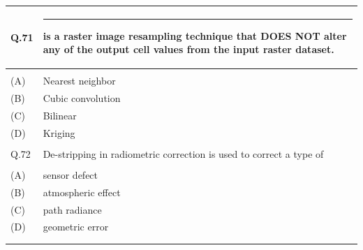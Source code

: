 \documentclass[12pt]{article}
\begin{document}
 \begin{table}[H]
\renewcommand{\arraystretch}{3}
\setlength{\tabcolsep}{8pt}
\begin{tabular}{|l|p{15cm}|}
\hline
 
Q.71&\rule{2cm}{0.15mm} is a raster image resampling technique that DOES NOT alter any of the
output cell values from the input raster dataset.\\ \hline 
&  \\ \hline
(A)&Nearest neighbor\\ \hline
(B)&Cubic convolution\\ \hline
(C)&Bilinear\\ \hline
(D)&Kriging\\ \hline
 & \\ \hline

Q.72 &De-stripping in radiometric correction is used to correct a type of\\ \hline
 & \\ \hline
(A)&sensor defect\\ \hline
(B)&atmospheric effect\\ \hline
(C)&path radiance\\ \hline
(D)&geometric error\\ \hline
& \\
& \\ \hline

\end{tabular}
\end{table}
 \newpage
\end{document}
